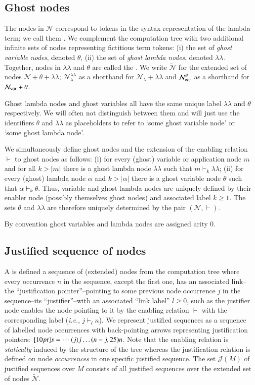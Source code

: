\documentclass{elsarticle}
\makeatletter
\theoremstyle{plain}
\theoremstyle{definition}
\theoremstyle{remark}
\newcommand\Nodes{\mathcal{N}}%
\newcommand\NodesVar{\Nodes_{\sf var}}%
\newcommand\NodesLmd{\Nodes_\lambda}%
\newcommand\ExtendedNodes{\tilde{\Nodes}}
\newcommand{\ghostlmd}{{\lambda\!\!\lambda}}
\newcommand{\ghostvar}{\theta}
\newcommand\ImNodesVar{\NodesVar^\ghostvar}
\newcommand\ImNodesLmd{\NodesLmd^\ghostlmd}
\newcommand{\enables}{\vdash} %
\renewcommand\ie{{\it i.e.\@\xspace}}
\def\justseqset{\mathcal{J}}
\makeatother
\begin{document}
\subsection{Ghost nodes}
The nodes in $\Nodes$ correspond to tokens in the syntax representation of the lambda term; we call them . We complement the computation tree with two additional infinite sets of nodes representing fictitious term tokens:
(i) the set of \emph{ghost variable nodes}, denoted $\ghostvar$, (ii) the set of \emph{ghost lambda nodes}, denoted $\ghostlmd$. Together, nodes in $\ghostlmd$ and $\ghostvar$ are called the . We write $\ExtendedNodes$ for the extended set of nodes $\Nodes + \ghostvar + \ghostlmd$; $\ImNodesLmd$ as a shorthand for $\NodesLmd + \ghostlmd$ and $\ImNodesVar$ as a shorthand for $\NodesVar + \ghostvar$.

Ghost lambda nodes and ghost variables all have the same unique label
$\ghostlmd$ and $\ghostvar$ respectively. We will often not distinguish between them and will just use the identifiers $\ghostvar$ and $\ghostlmd$ as placeholders to refer to `some ghost variable node' or `some ghost lambda node'.

We simultaneously define ghost nodes and the extension of the enabling relation $\enables$ to ghost nodes as follows: (i) for every (ghost) variable or application node $m$ and for all $k>|m|$ there is a ghost lambda node $\ghostlmd$ such that $m \enables_k \ghostlmd$; (ii) for every (ghost) lambda node $\alpha$ and $k>|\alpha|$ there is a ghost variable node $\ghostvar$ such that $\alpha \enables_k \ghostvar$. Thus, variable and ghost lambda nodes are uniquely defined by their enabler node (possibly themselves ghost nodes) and associated label $k\geq 1$.
The sets $\ghostvar$ and $\ghostlmd$ are therefore uniquely determined by the pair $(\Nodes, \enables)$.

By convention ghost variables and lambda nodes are assigned arity $0$.

\subsection{Justified sequence of nodes}
\label{sec:justseq}

A  is defined a sequence of (extended) nodes from the computation tree where every occurrence $n$ in the sequence, except the first one, has an associated link--the ``justification pointer''--pointing to some previous node occurrence $j$ in the sequence--its ``justifier''--with an associated ``link label'' $l\geq0$, such as the justifier node enables the node pointing to it by the enabling relation $\enables$ with the corresponding label (\ie, $j \enables_l n$). We represent justified sequences as a sequence of labelled node occurrences with back-pointing arrows representing justification pointers:
$\Pstr[10pt]{ s = \cdots (j){j} \ldots (n-j,25){n} }$. Note that the enabling relation is \emph{statically} induced by the structure of the tree whereas the justification relation is defined on node \emph{occurrences} in one specific justified sequence. The set $\justseqset(M)$ of justified sequences over $M$ consists of all justified sequences over the extended set of nodes $\ExtendedNodes$.
\end{document}
